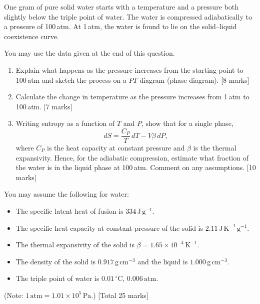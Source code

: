 One gram of pure solid water starts with a temperature and a
pressure both slightly below the triple point of water. The water is compressed
adiabatically to a pressure of 100\,atm. At 1\,atm, the water is found to lie
on the solid--liquid coexistence curve.

You may use the data given at the end of this question.

\begin{enumerate}

  \item Explain what happens as the pressure increases from the starting point
    to 100\,atm and sketch the process on a $PT$ diagram (phase diagram).
    \hfill [8 marks]

  \item Calculate the change in temperature as the pressure increases from
    1\,atm to 100\,atm. \hfill [7 marks]

  \item Writing entropy as a function of $T$ and $P$, show that for a single
    phase,
    \begin{equation}
      d S = \frac{C_P}{T}\,d T - V\beta\,d P,
    \end{equation}
    where $C_P$ is the heat capacity at constant pressure and $\beta$ is the
    thermal expansivity. Hence, for the adiabatic compression, estimate what
    fraction of the water is in the liquid phase at 100\,atm. Comment on any
    assumptions. \hfill [10 marks]
\end{enumerate}

You may assume the following for water:
\begin{itemize}
  \item The specific latent heat of fusion is $334\,\mathrm{J\,g^{-1}}$.
  \item The specific heat capacity at constant pressure of the solid is
    $2.11\,\mathrm{J\,K^{-1}\,g^{-1}}$.
  \item The thermal expansivity of the solid is
    $\beta = 1.65\times10^{-4}\,\mathrm{K^{-1}}$.
  \item The density of the solid is $0.917\,\mathrm{g\,cm^{-3}}$ and the
    liquid is $1.000\,\mathrm{g\,cm^{-3}}$.
  \item The triple point of water is $0.01\,^{\circ}\mathrm{C}$,
    $0.006\,\mathrm{atm}$.
\end{itemize}

\noindent (Note: $1\,\mathrm{atm} = 1.01\times10^{5}\,\mathrm{Pa}$.)
\hfill [Total 25 marks]

